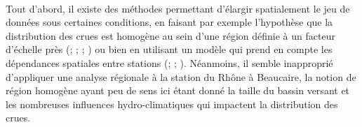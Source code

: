 	\paragraph{}Tout d'abord, il existe des méthodes permettant d'élargir spatialement le jeu de données sous certaines conditions, en faisant par exemple l'hypothèse que la distribution des crues est homogène au sein d'une région définie à un facteur d'échelle près (\citet{hosking_regional_1997}; \citet{gaume_bayesian_2010}; \citet{viglione_flood_2013}; \citet{nguyen_regional_2014}) ou bien en utilisant un modèle qui prend en compte les dépendances spatiales entre stations (\citet{kjeldsen_exploratory_2009}; \citet{renard_bayesian_2011}; \citet{sun_general_2014}). Néanmoins, il semble inapproprié d'appliquer une analyse régionale à la station du Rhône à Beaucaire, la notion de région homogène ayant peu de sens ici étant donné la taille du bassin versant et les nombreuses influences hydro-climatiques qui impactent la distribution des crues.
	
